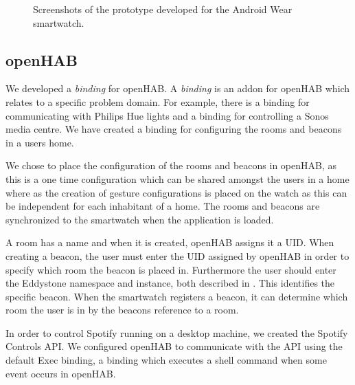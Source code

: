 \begin{figure}[!htb]
{    }
    \caption{Screenshots of the prototype developed for the Android Wear smartwatch.}
    \label{fig:implementation:prototype:screenshots}
\end{figure}

\subsection{openHAB}
\label{sec:implementation:prototype:openhab}

We developed a \emph{binding} for openHAB. A \emph{binding} is an addon for openHAB which relates to a specific problem domain. For example, there is a binding for communicating with Philips Hue lights and a binding for controlling a Sonos media centre. We have created a binding for configuring the rooms and beacons in a users home.

We chose to place the configuration of the rooms and beacons in openHAB, as this is a one time configuration which can be shared amongst the users in a home where as the creation of gesture configurations is placed on the watch as this can be independent for each inhabitant of a home. The rooms and beacons are synchronized to the smartwatch when the application is loaded.

A room has a name and when it is created, openHAB assigns it a UID. When creating a beacon, the user must enter the UID assigned by openHAB in order to specify which room the beacon is placed in. Furthermore the user should enter the Eddystone namespace and instance, both described in . This identifies the specific beacon. When the smartwatch registers a beacon, it can determine which room the user is in by the beacons reference to a room.

In order to control Spotify running on a desktop machine, we created the Spotify Controls API. We configured openHAB to communicate with the API using the default Exec binding, a binding which executes a shell command when some event occurs in openHAB.

